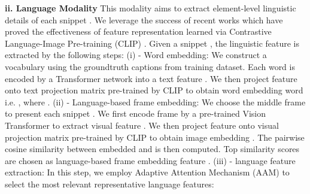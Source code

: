 \documentclass{article}
\begin{document}
\begin{table*}[!t]
\centering
\caption{Performance comparison of \model with other SOTA models on ActivityNet Captions \textit{ae-test}.  denotes results by us.} 
\label{tab:anet_test}
\vspace{-4mm}
\end{table*}

\noindent
\textbf{ii. Language Modality} 
This modality aims to extract element-level linguistic details of each snippet . We leverage the success of recent works \cite{Patashnik2021styleclip, Yang2021} which have proved the effectiveness of feature representation learned via Contrastive Language-Image Pre-training (CLIP) \cite{radford2021learning}. Given a snippet , the linguistic feature  is extracted by the following steps: (i) - Word embedding: We construct a vocabulary  using the groundtruth captions from training dataset. Each word  is encoded by a Transformer network \cite{vaswani2017attention} into a text feature . We then project feature  onto text projection matrix  pre-trained by CLIP to obtain word embedding word i.e. , where . (ii) - Language-based frame embedding: We choose the middle frame  to present each snippet . We first encode frame  by a pre-trained Vision Transformer \cite{dosovitskiy2020image} to extract visual feature . We then project feature  onto visual projection matrix  pre-trained by CLIP to obtain image embedding . The pairwise cosine similarity between embedded  and  is then computed. Top  similarity scores are chosen as language-based frame embedding feature . (iii) -  language feature extraction: In this step, we employ Adaptive Attention Mechanism (AAM) \cite{vo2021aei} to select the most relevant representative language features:
\vspace{-1.2mm}
\end{document}
